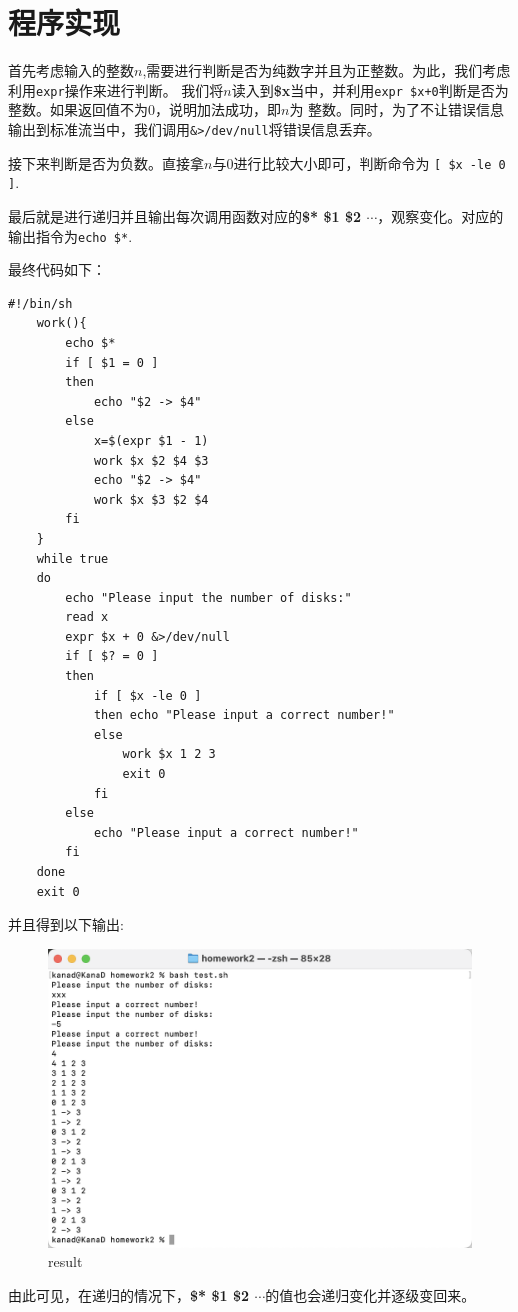 \newpage
\section{程序实现}
首先考虑输入的整数$n$,需要进行判断是否为纯数字并且为正整数。为此，我们考虑利用\verb|expr|操作来进行判断。
我们将$n$读入到\textbf{\$x}当中，并利用\verb|expr $x+0|判断是否为整数。如果返回值不为0，说明加法成功，即$n$为
整数。同时，为了不让错误信息输出到标准流当中，我们调用\verb|&>/dev/null|将错误信息丢弃。
\par 
接下来判断是否为负数。直接拿$n$与0进行比较大小即可，判断命令为 \verb|[ $x -le 0 ]|.
\par 
最后就是进行递归并且输出每次调用函数对应的\textbf{\$* \$1 \$2 $\cdots$}，观察变化。对应的输出指令为\verb|echo $*|.
\par 
最终代码如下：

\lstset{language=bash}
\begin{lstlisting}[caption = code]
    #!/bin/sh
    work(){
        echo $*
        if [ $1 = 0 ]
        then 
            echo "$2 -> $4"
        else
            x=$(expr $1 - 1)
            work $x $2 $4 $3
            echo "$2 -> $4"
            work $x $3 $2 $4  
        fi
    }   
    while true
    do
        echo "Please input the number of disks:"
        read x
        expr $x + 0 &>/dev/null
        if [ $? = 0 ] 
        then
            if [ $x -le 0 ] 
            then echo "Please input a correct number!"
            else
                work $x 1 2 3
                exit 0
            fi
        else
            echo "Please input a correct number!"
        fi
    done  
    exit 0
\end{lstlisting}
\par 
并且得到以下输出:
\begin{figure}[h]
    \centering
    \includegraphics[width=12cm]{./result.png} 
    \caption{result} 
\end{figure}
\par 
由此可见，在递归的情况下，\textbf{\$* \$1 \$2 $\cdots$}的值也会递归变化并逐级变回来。